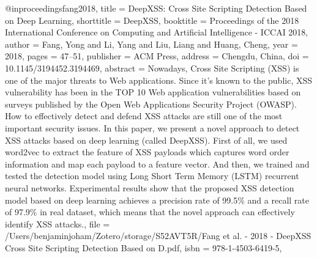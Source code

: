 @inproceedings{fang2018,
  title = {{{DeepXSS}}: {{Cross Site Scripting Detection Based}} on {{Deep Learning}}},
  shorttitle = {{{DeepXSS}}},
  booktitle = {Proceedings of the 2018 {{International Conference}} on {{Computing}} and {{Artificial Intelligence}} - {{ICCAI}} 2018},
  author = {Fang, Yong and Li, Yang and Liu, Liang and Huang, Cheng},
  year = {2018},
  pages = {47--51},
  publisher = {{ACM Press}},
  address = {{Chengdu, China}},
  doi = {10.1145/3194452.3194469},
  abstract = {Nowadays, Cross Site Scripting (XSS) is one of the major threats to Web applications. Since it's known to the public, XSS vulnerability has been in the TOP 10 Web application vulnerabilities based on surveys published by the Open Web Applications Security Project (OWASP). How to effectively detect and defend XSS attacks are still one of the most important security issues. In this paper, we present a novel approach to detect XSS attacks based on deep learning (called DeepXSS). First of all, we used word2vec to extract the feature of XSS payloads which captures word order information and map each payload to a feature vector. And then, we trained and tested the detection model using Long Short Term Memory (LSTM) recurrent neural networks. Experimental results show that the proposed XSS detection model based on deep learning achieves a precision rate of 99.5\% and a recall rate of 97.9\% in real dataset, which means that the novel approach can effectively identify XSS attacks.},
  file = {/Users/benjaminjoham/Zotero/storage/S52AVT5R/Fang et al. - 2018 - DeepXSS Cross Site Scripting Detection Based on D.pdf},
  isbn = {978-1-4503-6419-5},
}

